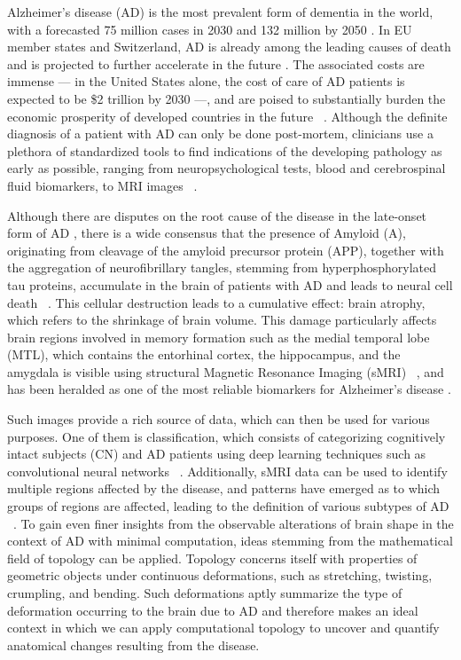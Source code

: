 \documentclass{article}
\begin{document}
Alzheimer's disease (AD) is the most prevalent form of dementia in the world, with a forecasted 75
million cases in 2030 and 132 million by 2050 \citep{world2017global}. In EU member states and
Switzerland, AD is already among the leading causes of death and is projected to further accelerate
in the future \citep{sleeman2019escalating}. The associated costs are immense --- in the United
States alone, the cost of care of AD patients is expected to be \$2 trillion by 2030 ---, and are
poised to substantially burden the economic prosperity of developed countries in the future
~\citep{world2017global}. Although the definite diagnosis of a patient with AD can only be done
post-mortem, clinicians use a plethora of standardized tools to find indications of the developing
pathology as early as possible, ranging from neuropsychological tests, blood and cerebrospinal fluid
biomarkers, to MRI images ~\citep{mckhann2011diagnosis, smits2012early, lehmann2016biomarkers}.

Although there are disputes on the root cause of the disease in the late-onset form of AD
\citep{tharp2013origins, fulop2018can, hur2020innate}, there is a wide consensus that the presence
of Amyloid \textbeta{} (A\textbeta{}), originating from cleavage of the amyloid precursor protein
(APP), together with the aggregation of neurofibrillary tangles, stemming from hyperphosphorylated
tau proteins, accumulate in the brain of patients with AD and leads to neural cell death
~\citep{da2016insights}. This cellular destruction leads to a cumulative effect: brain atrophy,
which refers to the shrinkage of brain volume. This damage particularly affects brain regions
involved in memory formation such as the medial temporal lobe (MTL), which contains the entorhinal
cortex, the hippocampus, and the amygdala \citep{goedert2006century} is visible
using structural Magnetic Resonance Imaging (sMRI) ~\citep{frisoni2010clinical}, and has been
heralded as one of the most reliable biomarkers for Alzheimer's disease \citep{pini2016brain}.

Such images provide a rich source of data, which can then be used for various purposes. One of them
is classification, which consists of categorizing cognitively intact subjects (CN) and AD patients
using deep learning techniques such as convolutional neural networks ~\citep{wen2020convolutional}.
Additionally, sMRI data can be used to identify multiple regions affected by the disease, and
patterns have emerged as to which groups of regions are affected, leading to the definition of
various subtypes of AD ~\citep{poulakis2018heterogeneous,tijms2020pathophysiological}. To gain even
finer insights from the observable alterations of brain shape in the context of AD with minimal
computation, ideas stemming from the mathematical field of topology can be applied. Topology
concerns itself with properties of geometric objects under continuous deformations, such as
stretching, twisting, crumpling, and bending. Such deformations aptly summarize the type of
deformation occurring to the brain due to AD and therefore makes an ideal context in which we can
apply computational topology to uncover and quantify anatomical changes resulting from the disease.
\end{document}

